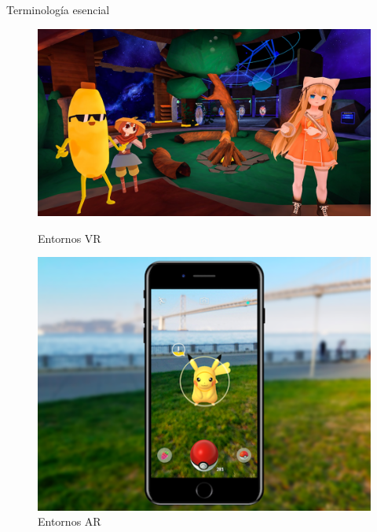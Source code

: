 \documentclass[aspectratio=169,17pt]{beamer}
\begin{document}
    \begin{frame}{Terminología esencial}
        \begin{figure}[ht]
            \begin{minipage}[b]{0.30\linewidth}
                \centering
                \includegraphics[width=\textwidth]{Ilustración 1.jpg}
                \caption{Entornos VR}
                \label{Ilu1}
            \end{minipage}
            \hspace{0.2cm}
            \begin{minipage}[b]{0.30\linewidth}
                \centering
                \includegraphics[width=\textwidth]{Ilustración 2.png}
                \caption{Entornos AR}
                \label{Ilu2}
            \end{minipage}
            \hspace{0.2cm}
            \begin{minipage}[b]{0.30\linewidth}

\end{minipage}
\end{figure}
\end{frame}
\end{document}

